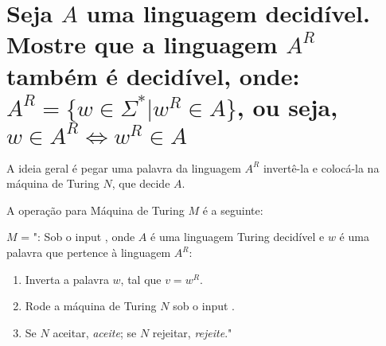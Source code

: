 \section{
    Seja \(A\) uma linguagem decidível. Mostre que a linguagem \(A^R\) também é decidível, onde: \\
    \(A^R = \{w \in \Sigma^* | w^R \in A\}\), ou seja,   
    \(w \in A^R \Leftrightarrow w^R \in A\)
    }

\setlength{\parindent}{4em}
\setlength{\parskip}{0.5em}
\renewcommand{\baselinestretch}{1}

A ideia geral é pegar uma palavra da linguagem \(A^R\) invertê-la e colocá-la na máquina de Turing \(N\), que decide \(A\).

A operação para Máquina de Turing \(M\) é a seguinte:

\(M\) = ": Sob o input \(<A, w>\), onde \(A\) é uma linguagem Turing decidível e \(w\) é uma palavra que pertence à linguagem \(A^R\):

\begin{enumerate}    
    \item Inverta a palavra \(w\), tal que \(v = w^R\).

    \item Rode a máquina de Turing \(N\) sob o input \(<A,v>\).

    \item Se \(N\) aceitar, \textit{aceite}; se \(N\) rejeitar, \textit{rejeite}."
\end{enumerate}